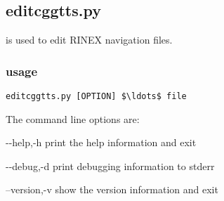 \subsection{editcggtts.py}

\hypertarget{h:editcggtts}{}

 is used to edit RINEX navigation files. 

\subsubsection{usage}

\begin{lstlisting}[mathescape=true]
editcggtts.py [OPTION] $\ldots$ file 
\end{lstlisting}
The command line options are:
\begin{description*}
	\item[-{}-help,-h]	print the help information and exit
	\item[-{}-debug,-d]	print debugging information to stderr
	\item[--version,-v] show the version information and exit
\end{description*}


